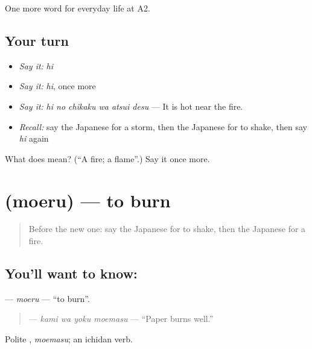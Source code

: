 \begin{grammarlens}[title={What you've built}]
One more word for everyday life at A2.
\end{grammarlens}

\subsection*{Your turn}
\begin{itemize}
\raggedright
  \item \emph{Say it:} \emph{hi}
  \item \emph{Say it:} \emph{hi}, once more
  \item \emph{Say it:} \emph{hi no chikaku wa atsui desu} — It is hot near the fire.
  \item \emph{Recall:} say the Japanese for a storm, then the Japanese for to shake, then say \emph{hi} again
\end{itemize}

\begin{tcolorbox}[breakable,colback=teal!4,colframe=teal!35!black,title={Before you move on}]
What does  mean? (\textquotedblleft{}A fire; a flame\textquotedblright{}.) Say it once more.
\end{tcolorbox}
\section[\texorpdfstring{\ja{もえる} (moeru)}{もえる (moeru)}]{ (moeru) — to burn}

\label{lesson:JA-C214-moeru}



\begin{quote}
Before the new one: say the Japanese for to shake, then the Japanese for a fire.
\end{quote}

\subsection*{You'll want to know: }
\textbf{} — \emph{moeru} — \textquotedblleft{}to burn\textquotedblright{}.

\begin{quote}
\textbf{  } — \emph{kami wa yoku moemasu} — \textquotedblleft{}Paper burns well.\textquotedblright{}
\end{quote}

Polite \textbf{}, \emph{moemasu}; an ichidan verb.

